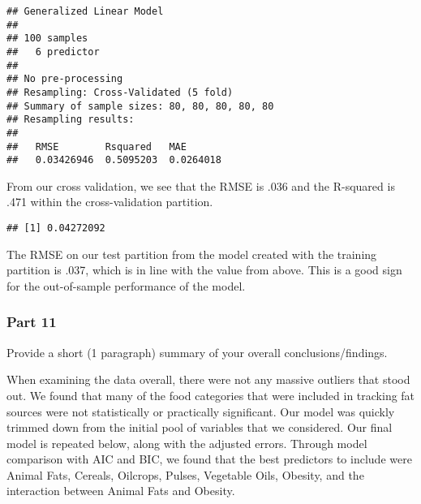 \documentclass[
]{article}
\newenvironment{Shaded}{\begin{snugshade}}{\end{snugshade}}
\newcommand{\CommentTok}[1]{\textcolor[rgb]{0.56,0.35,0.01}{\textit{#1}}}
\newcommand{\DataTypeTok}[1]{\textcolor[rgb]{0.13,0.29,0.53}{#1}}
\newcommand{\KeywordTok}[1]{\textcolor[rgb]{0.13,0.29,0.53}{\textbf{#1}}}
\newcommand{\NormalTok}[1]{#1}
\newcommand{\OperatorTok}[1]{\textcolor[rgb]{0.81,0.36,0.00}{\textbf{#1}}}
\newcommand{\StringTok}[1]{\textcolor[rgb]{0.31,0.60,0.02}{#1}}
\begin{document}
\begin{verbatim}
## Generalized Linear Model 
## 
## 100 samples
##   6 predictor
## 
## No pre-processing
## Resampling: Cross-Validated (5 fold) 
## Summary of sample sizes: 80, 80, 80, 80, 80 
## Resampling results:
## 
##   RMSE        Rsquared   MAE      
##   0.03426946  0.5095203  0.0264018
\end{verbatim}

From our cross validation, we see that the RMSE is .036 and the
R-squared is .471 within the cross-validation partition.

\begin{Shaded}
\end{Shaded}

\begin{verbatim}
## [1] 0.04272092
\end{verbatim}

The RMSE on our test partition from the model created with the training
partition is .037, which is in line with the value from above. This is a
good sign for the out-of-sample performance of the model.

\hypertarget{part-11}{%
\subsubsection{Part 11}\label{part-11}}

Provide a short (1 paragraph) summary of your overall
conclusions/findings.

When examining the data overall, there were not any massive outliers
that stood out. We found that many of the food categories that were
included in tracking fat sources were not statistically or practically
significant. Our model was quickly trimmed down from the initial pool of
variables that we considered. Our final model is repeated below, along
with the adjusted errors. Through model comparison with AIC and BIC, we
found that the best predictors to include were Animal Fats, Cereals,
Oilcrops, Pulses, Vegetable Oils, Obesity, and the interaction between
Animal Fats and Obesity.
\end{document}
